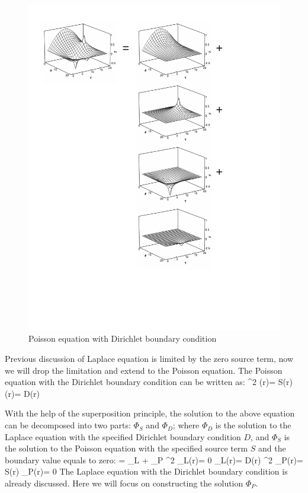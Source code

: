\begin{figure}[htbp]
\includegraphics[width=6in]{../figures/SES/example_Laplace+Poisson.pdf}
\caption{Poisson equation with Dirichlet boundary condition}
\label{fig:example-Laplace-Poisson}
\end{figure}


Previous discussion of Laplace equation is limited by the zero source term, now we will drop the limitation and extend to the Poisson equation.
The Poisson equation with the Dirichlet boundary condition can be written as:
\ba
\n^2 \Phi(r)= S(r) \hst {} \hst \Omega \hst {} \hst
\Phi(r)= D(r) \hst {} \hst \p \Omega
\label{eqn:Poisson-Dirichlet}
\ea

With the help of the superposition principle, the solution to the above equation can be decomposed into two parts: $\Phi_S$ and $\Phi_D$; where $\Phi_D$ is the solution to the Laplace equation with the specified Dirichlet boundary condition $D$, and $\Phi_S$ is the solution to the Poisson equation with the specified source term $S$ and the boundary value equals to zero:
\be
\Phi = \Phi_L + \Phi_P
\ee
\be
\n^2 \Phi_L(r)= 0 \hst {} \hst \Omega
\hsand
\Phi_L(r)= D(r) \hs{0.2in}  \hs{0.2in} \p\Omega
\ee
\be
\n^2 \Phi_P(r)= S(r) \hst {} \hst \Omega
\hsand
\Phi_P(r)= 0 \hs{0.2in}  \hs{0.2in} \p\Omega
\ee
The Laplace equation with the Dirichlet boundary condition is already discussed. Here we will focus on constructing the solution $\Phi_P$.

